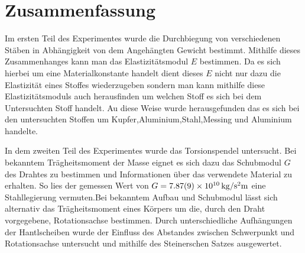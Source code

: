 
\section{Zusammenfassung}
Im ersten Teil des Experimentes wurde die Durchbiegung von verschiedenen Stäben in Abhängigkeit von dem
Angehängten Gewicht bestimmt. Mithilfe dieses Zusammenhanges kann man das Elastizitätsmodul $E$ bestimmen. Da es sich hierbei um eine Materialkonstante handelt dient dieses $E$ nicht nur dazu die Elastizität eines Stoffes wiederzugeben sondern man kann mithilfe diese Elastizitätsmoduls auch herausfinden um welchen Stoff es sich bei dem Untersuchten Stoff handelt.
Au diese Weise wurde herausgefunden das es sich bei den untersuchten Stoffen um Kupfer,Aluminium,Stahl,Messing und Aluminium handelte.

In dem zweiten Teil des Experimentes wurde das Torsionspendel untersucht. Bei bekanntem Trägheitsmoment der Masse eignet es sich dazu das Schubmodul $G$ des Drahtes zu bestimmen und Informationen über das verwendete Material zu erhalten. So lies der gemessen Wert von $G=\SI{7.87+-0.09e10}{kg \per \second \squared  \metre}$ eine Stahllegierung vermuten.Bei bekanntem Aufbau und Schubmodul lässt sich alternativ das Trägheitsmoment eines Körpers um die, durch den Draht vorgegebene, Rotationsachse bestimmen. Durch unterschiedliche Aufhängungen der Hantlscheiben wurde der Einfluss des Abstandes zwischen Schwerpunkt und Rotationsachse untersucht und mithilfe des Steinerschen Satzes ausgewertet.